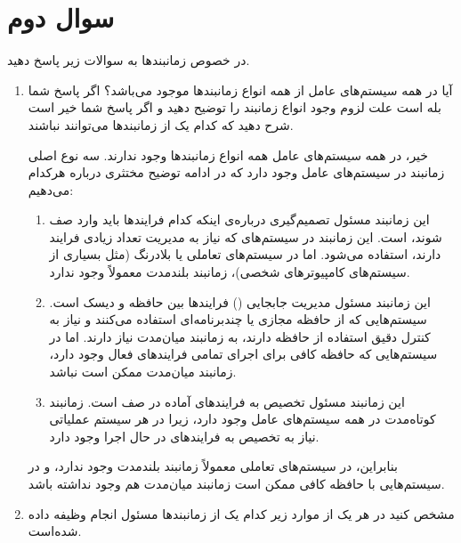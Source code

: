 \section{سوال دوم}

در خصوص زمانبندها به سوالات زیر پاسخ دهید.

\begin{enumerate}
	\item 
	آیا در همه سیستم‌های عامل از همه انواع زمانبندها موجود می‌باشد؟ اگر پاسخ شما بله است علت لزوم وجود انواع زمانبند را توضیح دهید و اگر پاسخ شما خیر است شرح دهید که کدام یک از زمانبندها می‌توانند نباشند.
	
	\begin{qsolve}
		خیر، در همه سیستم‌های عامل همه انواع زمانبندها وجود ندارند. سه نوع اصلی زمانبند در سیستم‌های عامل وجود دارد که در ادامه توضیح مختثری درباره هرکدام می‌دهیم:
		
		\begin{enumerate}
			\item 
			\textbf{}
			این زمانبند مسئول تصمیم‌گیری درباره‌ی اینکه کدام فرایندها باید وارد صف  شوند، است. این زمانبند در سیستم‌های  که نیاز به مدیریت تعداد زیادی فرایند دارند، استفاده می‌شود. اما در سیستم‌های تعاملی یا بلادرنگ (مثل بسیاری از سیستم‌های کامپیوترهای شخصی)، زمانبند بلندمدت معمولاً وجود ندارد.
			
			
			\item 
			\textbf{}
			این زمانبند مسئول مدیریت جابجایی () فرایندها بین حافظه و دیسک است. سیستم‌هایی که از حافظه مجازی یا چندبرنامه‌ای استفاده می‌کنند و نیاز به کنترل دقیق استفاده از حافظه دارند، به زمانبند میان‌مدت نیاز دارند. اما در سیستم‌هایی که حافظه کافی برای اجرای تمامی فرایندهای فعال وجود دارد، زمانبند میان‌مدت ممکن است نباشد.
			
			\item 
			\textbf{}
		این زمانبند مسئول تخصیص  به فرایندهای آماده در صف است. زمانبند کوتاه‌مدت در همه سیستم‌های عامل وجود دارد، زیرا در هر سیستم عملیاتی نیاز به تخصیص  به فرایندهای در حال اجرا وجود دارد.
		\end{enumerate}
		بنابراین، در سیستم‌های تعاملی معمولاً زمانبند بلندمدت وجود ندارد، و در سیستم‌هایی با حافظه کافی ممکن است زمانبند میان‌مدت هم وجود نداشته باشد.
	\end{qsolve}
	
	
	
	\item 
	مشخص کنید در هر یک از موارد زیر کدام یک از زمانبندها مسئول انجام وظیفه داده شده‌است.
	

\end{enumerate}
